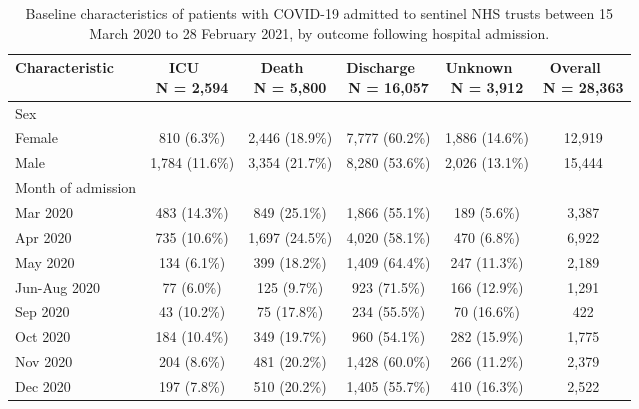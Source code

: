 
\begin{longtable}[t]{lccccc}
\caption{\label{tab:sari_characteristics}Baseline characteristics of patients with COVID-19 admitted to sentinel NHS trusts between 15 March 2020 to 28 February 2021, by outcome following hospital admission.}\\
\toprule
\textbf{Characteristic} & \makecell[c]{\textbf{ICU}\ \ \\N = 2,594} & \makecell[c]{\textbf{Death}\ \ \\N = 5,800} & \makecell[c]{\textbf{Discharge}\ \ \\N = 16,057} & \makecell[c]{\textbf{Unknown}\ \ \\N = 3,912} & \makecell[c]{\textbf{Overall}\ \ \\N = 28,363}\\
\midrule
Sex &  &  &  &  & \\
\hspace{1em}Female & 810 (6.3\%) & 2,446 (18.9\%) & 7,777 (60.2\%) & 1,886 (14.6\%) & 12,919\\
\hspace{1em}Male & 1,784 (11.6\%) & 3,354 (21.7\%) & 8,280 (53.6\%) & 2,026 (13.1\%) & 15,444\\
Month of admission &  &  &  &  & \\
\hspace{1em}Mar 2020 & 483 (14.3\%) & 849 (25.1\%) & 1,866 (55.1\%) & 189 (5.6\%) & 3,387\\
\hspace{1em}Apr 2020 & 735 (10.6\%) & 1,697 (24.5\%) & 4,020 (58.1\%) & 470 (6.8\%) & 6,922\\
\hspace{1em}May 2020 & 134 (6.1\%) & 399 (18.2\%) & 1,409 (64.4\%) & 247 (11.3\%) & 2,189\\
\hspace{1em}Jun-Aug 2020 & 77 (6.0\%) & 125 (9.7\%) & 923 (71.5\%) & 166 (12.9\%) & 1,291\\
\hspace{1em}Sep 2020 & 43 (10.2\%) & 75 (17.8\%) & 234 (55.5\%) & 70 (16.6\%) & 422\\
\hspace{1em}Oct 2020 & 184 (10.4\%) & 349 (19.7\%) & 960 (54.1\%) & 282 (15.9\%) & 1,775\\
\hspace{1em}Nov 2020 & 204 (8.6\%) & 481 (20.2\%) & 1,428 (60.0\%) & 266 (11.2\%) & 2,379\\
\hspace{1em}Dec 2020 & 197 (7.8\%) & 510 (20.2\%) & 1,405 (55.7\%) & 410 (16.3\%) & 2,522\\

\end{longtable}
